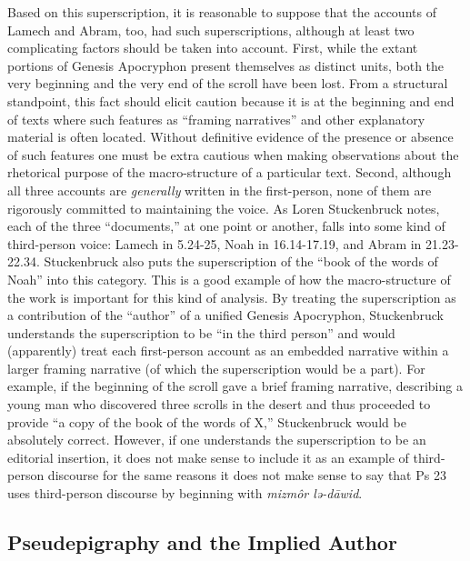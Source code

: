 Based on this superscription, it is reasonable to suppose that the
accounts of Lamech and Abram, too, had such superscriptions, although at
least two complicating factors should be taken into account. First,
while the extant portions of Genesis Apocryphon present themselves as
distinct units, both the very beginning and the very end of the scroll
have been lost. From a structural standpoint, this fact should elicit
caution because it is at the beginning and end of texts where such
features as ``framing narratives'' and other explanatory material is
often located. Without definitive evidence of the presence or absence of
such features one must be extra cautious when making observations about
the rhetorical purpose of the macro-structure of a particular text.
Second, although all three accounts are \emph{generally} written in the
first-person, none of them are rigorously committed to maintaining the
voice. As Loren Stuckenbruck notes, each of the three ``documents,'' at
one point or another, falls into some kind of third-person voice: Lamech
in 5.24-25, Noah in 16.14-17.19, and Abram in 21.23-22.34. Stuckenbruck
also puts the superscription of the ``book of the words of Noah'' into
this category. This is a good example of how the macro-structure of the
work is important for this kind of analysis. By treating the
superscription as a contribution of the ``author'' of a unified
Genesis Apocryphon, Stuckenbruck understands the superscription to be
``in the third person'' and would (apparently) treat each first-person
account as an embedded narrative within a larger framing narrative (of
which the superscription would be a part). For example, if the beginning
of the scroll gave a brief framing narrative, describing a young man who
discovered three scrolls in the desert and thus proceeded to provide ``a
copy of the book of the words of X,'' Stuckenbruck would be absolutely
correct. However, if one understands the superscription to be an
editorial insertion, it does not make sense to include it as an example
of third-person discourse for the same reasons it does not make sense to
say that Ps 23 uses third-person discourse by beginning with
\emph{mizmôr
lə-dāwid}.\autocites[315--316]{stuckenbruck_roitman-etal2011}[See
also][15--16. Even supposing a single author for Genesis Apocryphon, as
Stuckenbruck and others imply, I am still inclined to consider the
superscriptions separately from the former examples because they would
exist outside the frame of each embedded
narrative.]{bernstein_chazon-etal1999}

\hypertarget{pseudepigraphy-and-the-implied-author}{%
\subsection{Pseudepigraphy and the Implied
Author}\label{pseudepigraphy-and-the-implied-author}}

